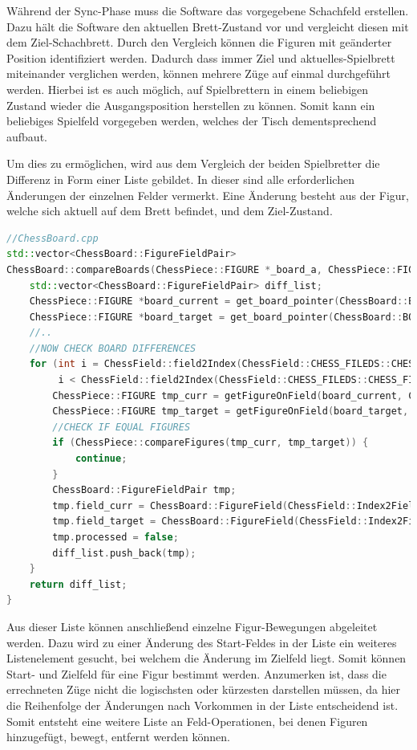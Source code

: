 Während der Sync-Phase muss die Software das vorgegebene Schachfeld
erstellen. Dazu hält die Software den aktuellen Brett-Zustand vor und
vergleicht diesen mit dem Ziel-Schachbrett. Durch den Vergleich können
die Figuren mit geänderter Position identifiziert werden. Dadurch dass
immer Ziel und aktuelles-Spielbrett miteinander verglichen werden,
können mehrere Züge auf einmal durchgeführt werden. Hierbei ist es auch
möglich, auf Spielbrettern in einem beliebigen Zustand wieder die
Ausgangsposition herstellen zu können. Somit kann ein beliebiges
Spielfeld vorgegeben werden, welches der Tisch dementsprechend aufbaut.

Um dies zu ermöglichen, wird aus dem Vergleich der beiden Spielbretter
die Differenz in Form einer Liste gebildet. In dieser sind alle
erforderlichen Änderungen der einzelnen Felder vermerkt. Eine Änderung
besteht aus der Figur, welche sich aktuell auf dem Brett befindet, und
dem Ziel-Zustand.

\begin{lstlisting}[language={C++}]
//ChessBoard.cpp
std::vector<ChessBoard::FigureFieldPair>
ChessBoard::compareBoards(ChessPiece::FIGURE *_board_a, ChessPiece::FIGURE *_board_b, bool _include_park_pos) {
    std::vector<ChessBoard::FigureFieldPair> diff_list;
    ChessPiece::FIGURE *board_current = get_board_pointer(ChessBoard::BOARD_TPYE::REAL_BOARD);
    ChessPiece::FIGURE *board_target = get_board_pointer(ChessBoard::BOARD_TPYE::TARGET_BOARD);
    //..
    //NOW CHECK BOARD DIFFERENCES
    for (int i = ChessField::field2Index(ChessField::CHESS_FILEDS::CHESS_FIELD_A1);
         i < ChessField::field2Index(ChessField::CHESS_FILEDS::CHESS_FIELD_PARK_POSTION_WHITE_1); i++) {
        ChessPiece::FIGURE tmp_curr = getFigureOnField(board_current, ChessField::Index2Field(i));
        ChessPiece::FIGURE tmp_target = getFigureOnField(board_target, ChessField::Index2Field(i));
        //CHECK IF EQUAL FIGURES
        if (ChessPiece::compareFigures(tmp_curr, tmp_target)) {
            continue;
        }
        ChessBoard::FigureFieldPair tmp;
        tmp.field_curr = ChessBoard::FigureField(ChessField::Index2Field(i), tmp_curr);
        tmp.field_target = ChessBoard::FigureField(ChessField::Index2Field(i), tmp_target);
        tmp.processed = false;
        diff_list.push_back(tmp);
    }
    return diff_list;
}
\end{lstlisting}

Aus dieser Liste können anschließend einzelne Figur-Bewegungen
abgeleitet werden. Dazu wird zu einer Änderung des Start-Feldes in der
Liste ein weiteres Listenelement gesucht, bei welchem die Änderung im
Zielfeld liegt. Somit können Start- und Zielfeld für eine Figur bestimmt
werden. Anzumerken ist, dass die errechneten Züge nicht die logischsten
oder kürzesten darstellen müssen, da hier die Reihenfolge der Änderungen
nach Vorkommen in der Liste entscheidend ist. Somit entsteht eine
weitere Liste an Feld-Operationen, bei denen Figuren hinzugefügt,
bewegt, entfernt werden können.

